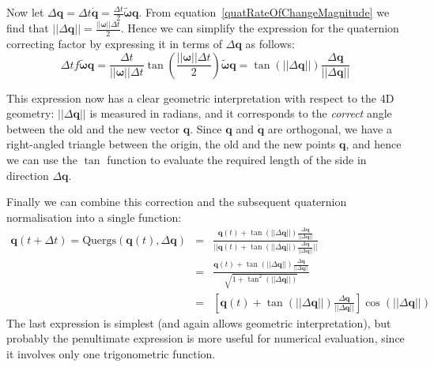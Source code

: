 Now let $\Delta \mathbf{q} = \Delta t \dot{\mathbf{q}} =
    \frac{\Delta t}{2} \tilde{\bm{\omega}} \mathbf{q}$.
From equation~\ref{quatRateOfChangeMagnitude} we find that
$||\Delta\mathbf{q}|| = \frac{||\bm{\omega}||\Delta t}{2}$.
Hence we can simplify the expression for the quaternion correcting factor by expressing it
in terms of $\Delta \mathbf{q}$ as follows:
$$
\Delta t f \tilde{\bm{\omega}}\mathbf{q} = \frac{\Delta t}{||\bm{\omega}||\Delta t}
    \tan\left(\frac{||\bm{\omega}||\Delta t}{2}\right) \tilde{\bm{\omega}} \mathbf{q} =
    \tan\left(||\Delta\mathbf{q}||\right) \frac{\Delta\mathbf{q}}{||\Delta\mathbf{q}||}
$$

This expression now has a clear geometric interpretation with respect to the 4D geometry:
$||\Delta\mathbf{q}||$ is measured in radians, and it corresponds to the {\em correct}
angle between the old and the new vector $\mathbf{q}$. Since $\mathbf{q}$ and
$\dot{\mathbf{q}}$ are orthogonal, we have a right-angled triangle between the origin,
the old and the new points $\mathbf{q}$, and hence we can use the $\tan$ function to
evaluate the required length of the side in direction $\Delta\mathbf{q}$.

Finally we can combine this correction and the subsequent quaternion normalisation into
a single function:
\begin{eqnarray*}
\mathbf{q}(t+\Delta t) = \mathrm{Quergs}(\mathbf{q}(t), \Delta\mathbf{q}) &=&
    \frac{\mathbf{q}(t) + \tan\left(||\Delta\mathbf{q}||\right)
        \frac{\Delta\mathbf{q}}{||\Delta\mathbf{q}||}}{
    ||\mathbf{q}(t) + \tan\left(||\Delta\mathbf{q}||\right)
        \frac{\Delta\mathbf{q}}{||\Delta\mathbf{q}||}||} \\
&=& \frac{\mathbf{q}(t) + \tan\left(||\Delta\mathbf{q}||\right)
        \frac{\Delta\mathbf{q}}{||\Delta\mathbf{q}||}}{
    \sqrt{1 + \tan^2\left(||\Delta\mathbf{q}||\right)}} \\
&=& \left[\mathbf{q}(t) + \tan\left(||\Delta\mathbf{q}||\right)
        \frac{\Delta\mathbf{q}}{||\Delta\mathbf{q}||}\right]
    \cos\left(||\Delta\mathbf{q}||\right)
\end{eqnarray*}
The last expression is simplest (and again allows geometric interpretation), but probably
the penultimate expression is more useful for numerical evaluation, since it involves only
one trigonometric function.
